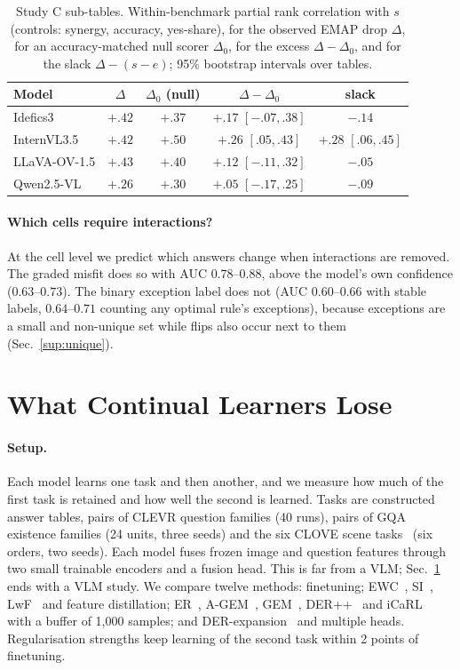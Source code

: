 \begin{table}[t]
\centering\small\setlength{\tabcolsep}{3pt}
\caption{Study C sub-tables. Within-benchmark partial rank correlation with $s$ (controls: synergy, accuracy,
yes-share), for the observed EMAP drop $\Delta$, for an accuracy-matched null scorer $\Delta_0$, for the excess
$\Delta-\Delta_0$, and for the slack $\Delta-(s-e)$; 95\% bootstrap intervals over tables.}
\label{tab:null}
\begin{tabular}{lcccc}
\toprule
Model & $\Delta$ & $\Delta_0$ (null) & $\Delta-\Delta_0$ & slack \\
\midrule
Idefics3     & $+.42$ & $+.37$ & $+.17$ $[-.07,.38]$ & $-.14$ \\
InternVL3.5  & $+.42$ & $+.50$ & $+.26$ $[.05,.43]$  & $+.28$ $[.06,.45]$ \\
LLaVA-OV-1.5 & $+.43$ & $+.40$ & $+.12$ $[-.11,.32]$ & $-.05$ \\
Qwen2.5-VL   & $+.26$ & $+.30$ & $+.05$ $[-.17,.25]$ & $-.09$ \\
\bottomrule
\end{tabular}
\end{table}

\paragraph{Which cells require interactions?}
At the cell level we predict which answers change when interactions are removed. The graded misfit does so with AUC
$0.78$--$0.88$, above the model's own confidence ($0.63$--$0.73$). The binary exception label does not (AUC $0.60$--$0.66$
with stable labels, $0.64$--$0.71$ counting any optimal rule's exceptions), because exceptions are a small and
non-unique set while flips also occur next to them (Sec.~\ref{sup:unique}).

\section{What Continual Learners Lose}
\label{sec:cl}

\paragraph{Setup.}
Each model learns one task and then another, and we measure how much of the first task is retained and how well the
second is learned. Tasks are constructed answer tables, pairs of CLEVR question families (40 runs), pairs of GQA
existence families (24 units, three seeds) and the six CLOVE scene tasks~\cite{lei2023symbolic} (six orders, two seeds).
Each model fuses frozen image and question features through two small trainable encoders and a fusion head. This is far
from a VLM; Sec.~\ref{sec:cl} ends with a VLM study. We compare twelve methods: finetuning; EWC~\cite{kirkpatrick2017overcoming},
SI~\cite{zenke2017continual}, LwF~\cite{li2017learning} and feature distillation; ER~\cite{chaudhry2019tiny},
A-GEM~\cite{chaudhry2019efficient}, GEM~\cite{lopezpaz2017gradient}, DER++~\cite{buzzega2020dark} and
iCaRL~\cite{rebuffi2017icarl} with a buffer of 1{,}000 samples; and DER-expansion~\cite{yan2021der} and multiple heads.
Regularisation strengths keep learning of the second task within 2 points of finetuning.

